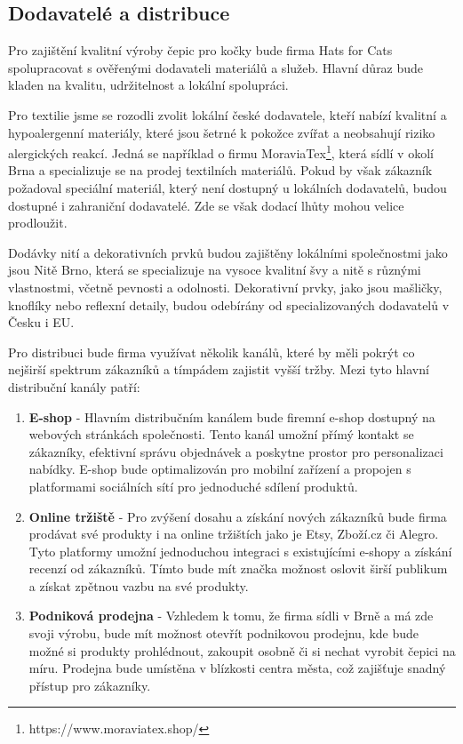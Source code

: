 \documentclass[12pt, a4paper]{article}
\begin{document}
\subsection{Dodavatelé a distribuce}

Pro zajištění kvalitní výroby čepic pro kočky bude firma Hats for Cats spolupracovat s ověřenými dodavateli materiálů a služeb.
Hlavní důraz bude kladen na kvalitu, udržitelnost a lokální spolupráci.

Pro textilie jsme se rozodli zvolit lokální české dodavatele, kteří nabízí
kvalitní a hypoalergenní materiály, které jsou šetrné k pokožce zvířat a
neobsahují riziko alergických reakcí. Jedná se například o firmu MoraviaTex\footnote{https://www.moraviatex.shop/},
která sídlí v okolí Brna a specializuje se na prodej textilních materiálů. Pokud
by však zákazník požadoval speciální materiál, který není dostupný u lokálních dodavatelů,
budou dostupné i zahraniční dodavatelé. Zde se však dodací lhůty mohou velice prodloužit.


Dodávky nití a dekorativních prvků budou zajištěny lokálními společnostmi
jako jsou Nitě Brno, která se specializuje na vysoce kvalitní švy a nitě s různými vlastnostmi, včetně pevnosti a odolnosti.
Dekorativní prvky, jako jsou mašličky, knoflíky nebo reflexní detaily, budou odebírány od specializovaných dodavatelů v Česku i EU.

\vspace{20pt}
\noindent Pro distribuci bude firma využívat několik kanálů, které by měli pokrýt co nejširší spektrum zákazníků a tímpádem
zajistit vyšší tržby. Mezi tyto hlavní distribuční kanály patří:

\begin{enumerate}
  \item \textbf{E-shop} -
  Hlavním distribučním kanálem bude firemní e-shop dostupný na webových stránkách společnosti. 
  Tento kanál umožní přímý kontakt se zákazníky, efektivní správu objednávek a poskytne prostor pro personalizaci nabídky. 
  E-shop bude optimalizován pro mobilní zařízení a propojen s platformami sociálních sítí pro jednoduché sdílení produktů.
  \item \textbf{Online tržiště} -
  Pro zvýšení dosahu a získání nových zákazníků bude firma prodávat své produkty i na online tržištích jako je Etsy, Zboží.cz či Alegro.
  Tyto platformy umožní jednoduchou integraci s existujícími e-shopy a získání recenzí od zákazníků.
  Tímto bude mít značka možnost oslovit širší publikum a získat zpětnou vazbu na své produkty.
  \item \textbf{Podniková prodejna} -
  Vzhledem k tomu, že firma sídli v Brně a má zde svoji výrobu, bude mít možnost otevřít podnikovou prodejnu, kde bude možné si produkty prohlédnout, zakoupit osobně
  či si nechat vyrobit čepici na míru. Prodejna bude umístěna v blízkosti centra města, což zajišťuje snadný přístup pro zákazníky.
\end{enumerate}
\end{document}
